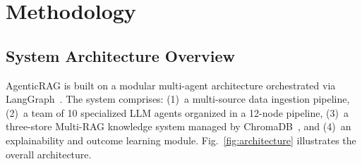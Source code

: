\documentclass[conference]{IEEEtran}
\begin{document}
\section{Methodology}

\subsection{System Architecture Overview}

AgenticRAG is built on a modular multi-agent architecture orchestrated via LangGraph~\cite{langgraph2025}. The system comprises: (1)~a multi-source data ingestion pipeline, (2)~a team of 10 specialized LLM agents organized in a 12-node pipeline, (3)~a three-store Multi-RAG knowledge system managed by ChromaDB~\cite{chromadb2025}, and (4)~an explainability and outcome learning module. Fig.~\ref{fig:architecture} illustrates the overall architecture.
\end{document}
